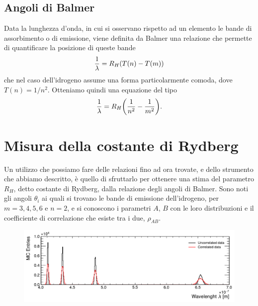 \documentclass[a4paper,preprintnumbers,aps,citeautoscript,notitlepage,12pt,tightenlines]{revtex4-2}
\begin{document}
\subsection{Angoli di Balmer}

Data la lunghezza d'onda, in cui si osservano rispetto ad un elemento le bande di assorbimento o di emissione, viene definita da Balmer una relazione che permette di quantificare la posizione di queste bande \begin{equation} \frac{1}{\lambda} = R_H \qty(T(n) - T(m)) \end{equation} che nel caso dell'idrogeno assume una forma particolarmente comoda, dove $T(n) = 1/n^2$. Otteniamo quindi una equazione del tipo \begin{equation} \frac{1}{\lambda} = R_H \qty(\frac{1}{n^2} - \frac{1}{m^2}). \end{equation}

\section{Misura della costante di Rydberg}

Un utilizzo che possiamo fare delle relazioni fino ad ora trovate, e dello strumento che abbiamo descritto, è quello di sfruttarlo per ottenere una stima del parametro $R_H$, detto costante di Rydberg, dalla relazione degli angoli di Balmer. Sono noti gli angoli $\theta_i$ ai quali si trovano le bande di emissione dell'idrogeno, per $m = 3, 4, 5, 6$ e $n=2$, e si conoscono i parametri $A$, $B$ con le loro distribuzioni e il coefficiente di correlazione che esiste tra i due, $\rho_{AB}$. 

\begin{figure}
\centering
\includegraphics[width=\linewidth]{../tasks/wavelenght}
\caption{}
\end{figure}
\end{document}

